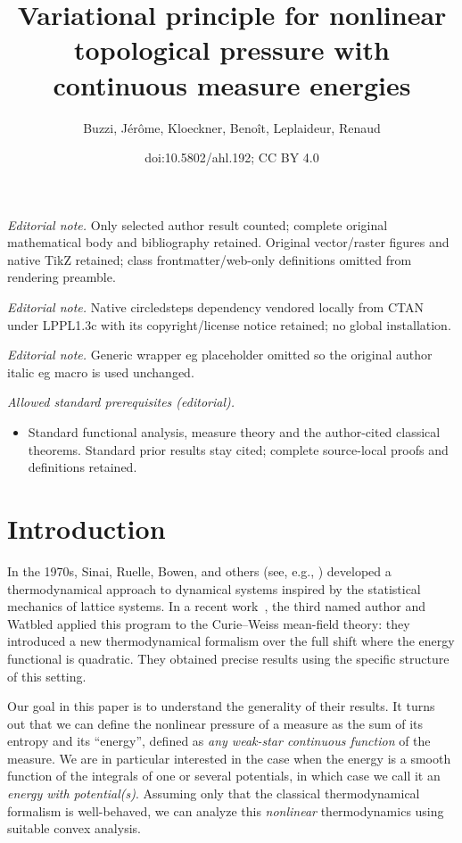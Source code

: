\documentclass[10pt]{amsart}
\title{Variational principle for nonlinear topological pressure with continuous measure energies}
\author{Buzzi, Jérôme, Kloeckner, Benoît, Leplaideur, Renaud}
\date{doi:10.5802/ahl.192; CC BY 4.0}
\theoremstyle{definition}\newtheorem{defi}[theo]{Definition}\newtheorem{rema}[theo]{Remark}\newtheorem{exam}[theo]{Example}\newtheorem{exem}[theo]{Example}\newtheorem{nota}[theo]{Notation}
\theoremstyle{plain}
\theoremstyle{plain}
\newcounter{In}
\newcommand*\8{\infty}
\begin{document}
\maketitle
\noindent\textit{Editorial note.} Only selected author result counted; complete original mathematical body and bibliography retained. Original vector/raster figures and native TikZ retained; class frontmatter/web-only definitions omitted from rendering preamble.\par\medskip
\noindent\textit{Editorial note.} Native circledsteps dependency vendored locally from CTAN under LPPL1.3c with its copyright/license notice retained; no global installation.\par\medskip
\noindent\textit{Editorial note.} Generic wrapper eg placeholder omitted so the original author italic eg macro is used unchanged.\par\medskip
\noindent\textit{Allowed standard prerequisites (editorial).}\begin{itemize}
\item Standard functional analysis, measure theory and the author-cited classical theorems. Standard prior results stay cited; complete source-local proofs and definitions retained.
\end{itemize}\medskip



\section{Introduction}

In the 1970s, Sinai, Ruelle, Bowen, and others (see, e.g., \cite{Bowen-book,Ruelle-book,Sinai-GibbsMeasures}) developed a thermodynamical approach to dynamical systems inspired by the statistical mechanics of lattice systems. In a recent work~\cite{Leplaideur-Watbled}, the third named author and Watbled applied this program to the Curie--Weiss mean-field theory: they introduced a new thermodynamical formalism over the full shift where the energy functional is quadratic. They obtained precise results using the specific structure of this setting.

Our goal in this paper is to understand the generality of their results. It turns out that we can define the nonlinear pressure of a measure as the sum of its entropy and its ``energy'', defined as \emph{any weak-star continuous function} of the measure. We are in particular interested in the case when the energy is a smooth function of the integrals of one or several potentials, in which case we call it an \emph{energy with potential(s)}. Assuming only that the classical thermodynamical formalism is well-behaved, we can analyze this \emph{nonlinear} thermodynamics using suitable convex analysis.
\end{document}
